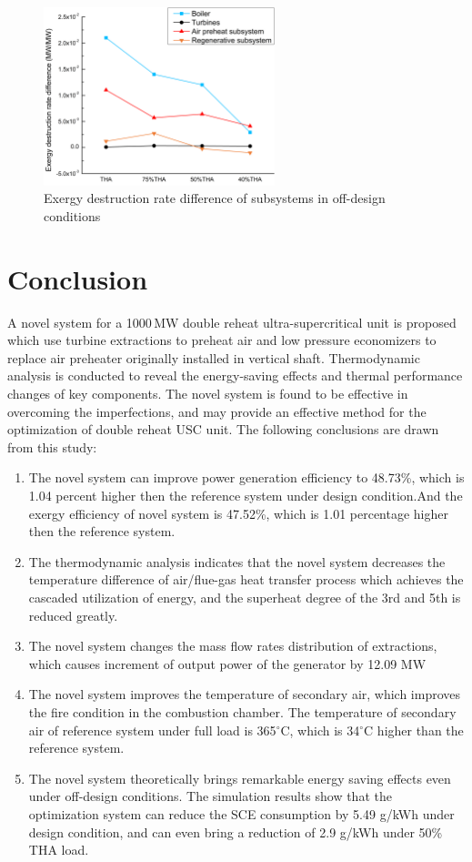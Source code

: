 \documentclass[preprint,12pt]{elsarticle}
\begin{document}
\begin{figure}[htbp]
\centering
\includegraphics[width=0.6\textwidth]{fig/partload_subsys_exergyrate.png}
\caption{Exergy destruction rate difference of subsystems in off-design conditions} 
\label{fig:partload_subsys_exergyrate}
\end{figure}


\section{Conclusion}
A novel system for a 1000\,MW double reheat ultra-supercritical unit is proposed which use turbine extractions to preheat air and low pressure economizers to replace air preheater originally installed in vertical shaft.
Thermodynamic analysis is conducted to reveal the energy-saving effects and thermal performance changes of key components. 
The novel system is found to be effective in overcoming the imperfections, and may provide an effective method for the optimization of  double reheat USC unit.
The following conclusions are drawn from this study: 
 \begin{enumerate}[(1)]
 \item The novel system can improve power generation efficiency to 48.73\%, which is 1.04 percent higher then the reference system under design condition.And the exergy efficiency of novel system is 47.52\%, which is 1.01 percentage higher then the reference system.
 \item The thermodynamic analysis indicates that the novel system decreases the temperature difference of air/flue-gas heat transfer process which achieves the cascaded utilization of energy, and the superheat degree of the 3rd and 5th is reduced greatly. 
\item The novel system changes the mass flow rates distribution of extractions, which causes increment of output power of the generator by 12.09 MW 
\item The novel system improves the temperature of secondary air, which improves the fire condition in the combustion chamber.
 The temperature of secondary air of reference system under full load is 365$^\circ$C, which is 34$^\circ$C higher than the reference system.
\item The novel system theoretically brings remarkable energy saving effects even under off-design conditions. The simulation results show that the optimization system can reduce the SCE consumption by 5.49 g/kWh under design condition, and can even bring a reduction of 2.9 g/kWh under 50\% THA load.
\end{enumerate}
\end{document}
